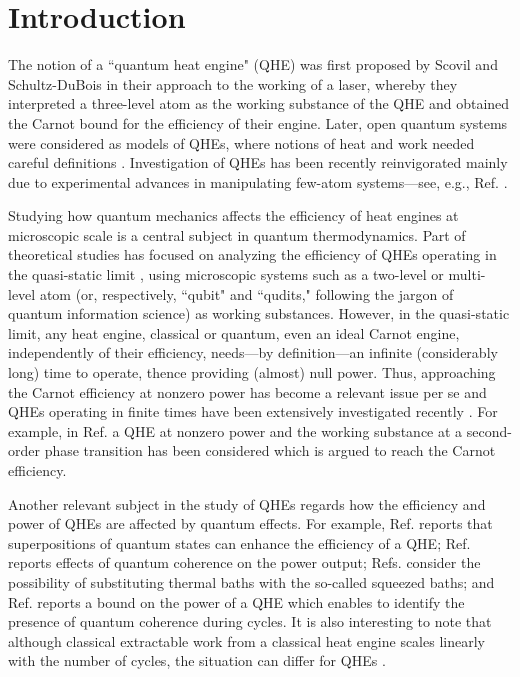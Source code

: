 \documentclass[aps,pra,floatfix,twocolumn,groupedaddress,superscriptaddress,nofootinbib,notitlepage,amsmath,amssymb,]{revtex4-1}
\begin{document}
\section{Introduction}
\label{sec:intr}

The notion of a ``quantum heat engine" (QHE) was first proposed by Scovil and Schultz-DuBois \cite{1959-Scovil} in their approach to the working of a laser, whereby they interpreted a three-level atom as the working substance of the QHE and obtained the Carnot bound for the efficiency of their engine. Later, open quantum systems were considered as models of QHEs, where notions of heat and work needed careful definitions \cite{1979-Alicki,1984-Kosloff,2016-Alipour}. Investigation of QHEs has been recently reinvigorated mainly due to experimental advances in manipulating few-atom systems---see, e.g., Ref. \cite{2016-Rosnagel}.
	
Studying how quantum mechanics affects the efficiency of heat engines at microscopic scale is a central subject in quantum thermodynamics. Part of theoretical studies has focused on analyzing the efficiency of QHEs operating in the quasi-static limit \cite{2000-Bender, 2006-Quan, 2007-Quan, 2009-Quan, 2012-Brunner, 2013-Huang, 2015-Altintas}, using microscopic systems such as a two-level or multi-level atom (or, respectively, ``qubit" and ``qudits," following the jargon of quantum information science) as working substances. However, in the quasi-static limit, any heat engine, classical or quantum, even an ideal Carnot engine, independently of their efficiency, needs---by definition---an infinite (considerably long) time to operate, thence providing (almost) null power. Thus, approaching the Carnot efficiency at nonzero power has become a relevant issue per se and QHEs operating in finite times have been extensively investigated recently \cite{1992-Kosloff,1996-Kosloff,Feldmann,2011-Skrzypczyk,2011-Benenti,2012-Wang,2013-Gelbwaser,2013-Allahverdyan,2014-Kosloff,2015a-Proesmans,2015b-Polettini,2015c-Brandner,2016-Campisi}. For example, in Ref. \cite{2016-Campisi} a QHE at nonzero power and the working substance at a second-order phase transition has been considered which is argued to reach the Carnot efficiency. 
	
Another relevant subject in the study of QHEs regards how the efficiency and power of QHEs are affected by quantum effects. For example, Ref. \cite{2012-Abe} reports that superpositions of quantum states can enhance the efficiency of a QHE; Ref. \cite{2013-Goswami} reports effects of quantum coherence on the power output; Refs. \cite{2011-DeLiberato, 2012-Zagoskin, 2014-Rosnagel} consider the possibility of substituting thermal baths with the so-called squeezed baths; and Ref. \cite{2015-Uzdin} reports a bound on the power of a QHE which enables to identify the presence of quantum coherence during cycles. It is also interesting to note that although classical extractable work from a classical heat engine scales linearly with the number of cycles, the situation can differ for QHEs \cite{2017-Watanabe}.	
\end{document}
